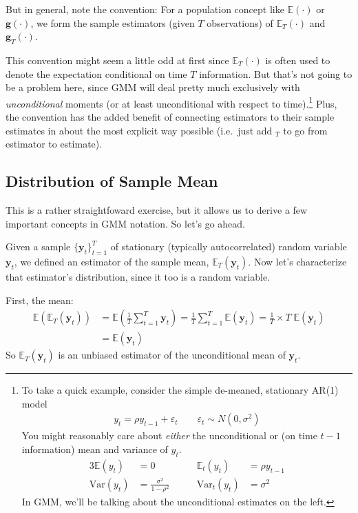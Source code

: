 \documentclass[12pt]{article}
\theoremstyle{plain}
\theoremstyle{definition}
\theoremstyle{remark}
\newcommand{\bsg}{\boldsymbol{g}}
\newcommand{\bsy}{\boldsymbol{y}}
\begin{document}
But in general, note the convention: For a population concept like
$\mathbb{E}(\cdot)$ or $\bsg(\cdot)$, we form the sample
estimators (given $T$ observations) of $\mathbb{E}_T(\cdot)$ and
$\bsg_T(\cdot)$.

This convention might seem a little odd at first since
$\mathbb{E}_T(\cdot)$ is often used to denote the expectation
conditional on time $T$ information. But that's not going to be a
problem here, since GMM will deal pretty much exclusively with
\emph{unconditional} moments (or at least unconditional with respect to
time).\footnote{%
To take a quick example, consider the simple de-meaned, stationary AR(1)
model
\begin{align*}
  y_t = \rho y_{t-1} + \varepsilon_t
  \qquad \varepsilon_t \sim N(0,\sigma^2)
\end{align*}
You might reasonably care about \emph{either} the unconditional or (on
time $t-1$ information) mean and variance of $y_t$.
\begin{alignat*}{3}
  \mathbb{E}(y_t) &= 0 &\mathbb{E}_t(y_{t}) &= \rho y_{t-1}\\
  \text{Var}(y_t) &= \frac{\sigma^2}{1-\rho^2}
  \qquad
  &\text{Var}_t(y_t) &= \sigma^2
\end{alignat*}
In GMM, we'll be talking about the unconditional estimates on the left.
}
Plus, the convention has the added benefit of connecting estimators to
their sample estimates in about the most explicit way possible (i.e.\
just add ${}_T$ to go from estimator to estimate).


\subsection{Distribution of Sample Mean}
\label{sec:mean}

This is a rather straightfoward exercise, but it allows us to derive a
few important concepts in GMM notation. So let's go ahead.

Given a sample $\{\bsy_t\}^T_{t=1}$ of stationary (typically
autocorrelated) random variable $\bsy_t$, we defined an
estimator of the sample mean, $\mathbb{E}_T(\bsy_t)$. Now
let's characterize that estimator's distribution, since it too is a
random variable.

First, the mean:
\begin{align*}
  \mathbb{E}\left(\mathbb{E}_T(\bsy_t)\right)
  &= \mathbb{E}\left(\frac{1}{T}\sum^T_{t=1} \bsy_t\right)
  = \frac{1}{T}\sum^T_{t=1} \mathbb{E}\left(\bsy_t\right)
  = \frac{1}{T} \times T \; \mathbb{E}\left(\bsy_t\right)\\
  &= \mathbb{E}\left(\bsy_t\right)
\end{align*}
So $\mathbb{E}_T(\bsy_t)$ is an unbiased estimator of the
unconditional mean of $\bsy_t$.
\end{document}
